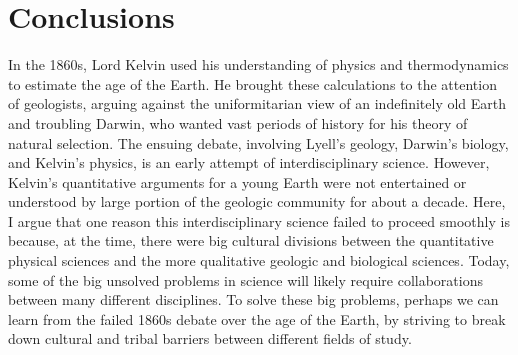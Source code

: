 \documentclass[12pt]{article}
\begin{document}
\section{Conclusions} \label{sec:4}

In the 1860s, Lord Kelvin used his understanding of physics and thermodynamics to estimate the age of the Earth. He brought these calculations to the attention of geologists, arguing against the uniformitarian view of an indefinitely old Earth and troubling Darwin, who wanted vast periods of history for his theory of natural selection. The ensuing debate, involving Lyell's geology, Darwin's biology, and Kelvin's physics, is an early attempt of interdisciplinary science. However, Kelvin's quantitative arguments for a young Earth were not entertained or understood by large portion of the geologic community for about a decade. Here, I argue that one reason this interdisciplinary science failed to proceed smoothly is because, at the time, there were big cultural divisions between the quantitative physical sciences and the more qualitative geologic and biological sciences. Today, some of the big unsolved problems in science will likely require collaborations between many different disciplines. To solve these big problems, perhaps we can learn from the failed 1860s debate over the age of the Earth, by striving to break down cultural and tribal barriers between different fields of study.



\end{document}
